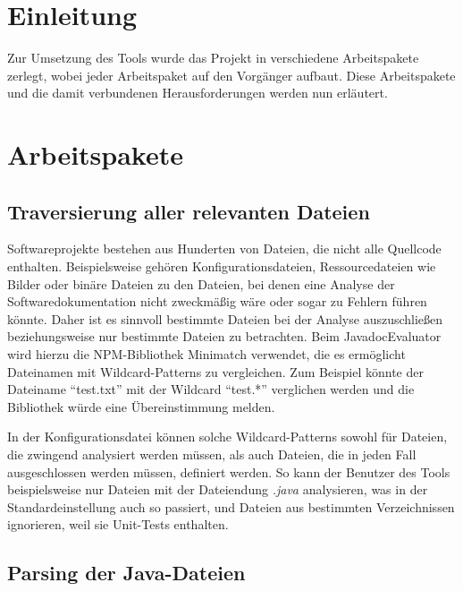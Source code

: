 \section{Einleitung}
Zur Umsetzung des Tools wurde das Projekt in verschiedene Arbeitspakete zerlegt, wobei jeder Arbeitspaket auf den Vorgänger aufbaut. Diese Arbeitspakete und die damit verbundenen Herausforderungen werden nun erläutert.  

  
\section{Arbeitspakete}
\subsection{Traversierung aller relevanten Dateien} 

Softwareprojekte bestehen aus Hunderten von Dateien, die nicht alle Quellcode enthalten. Beispielsweise gehören Konfigurationsdateien, Ressourcedateien wie Bilder oder binäre Dateien zu den Dateien, bei denen eine Analyse der Softwaredokumentation nicht zweckmäßig wäre oder sogar zu Fehlern führen könnte. Daher ist es sinnvoll bestimmte Dateien bei der Analyse auszuschließen beziehungsweise nur bestimmte Dateien zu betrachten. Beim JavadocEvaluator wird hierzu die NPM-Bibliothek Minimatch \cite{Minimatch} verwendet, die es ermöglicht Dateinamen mit Wildcard-Patterns zu vergleichen. Zum Beispiel könnte der Dateiname \enquote{test.txt} mit der Wildcard \enquote{test.*} verglichen werden und die Bibliothek würde eine Übereinstimmung melden.  

  

In der Konfigurationsdatei können solche Wildcard-Patterns sowohl für Dateien, die zwingend analysiert werden müssen, als auch Dateien, die in jeden Fall ausgeschlossen werden müssen, definiert werden. So kann der Benutzer des Tools beispielsweise nur Dateien mit der Dateiendung \textit{.java} analysieren, was in der Standardeinstellung auch so passiert, und Dateien aus bestimmten Verzeichnissen ignorieren, weil sie Unit-Tests enthalten.   

  

\subsection{Parsing der Java-Dateien} 

